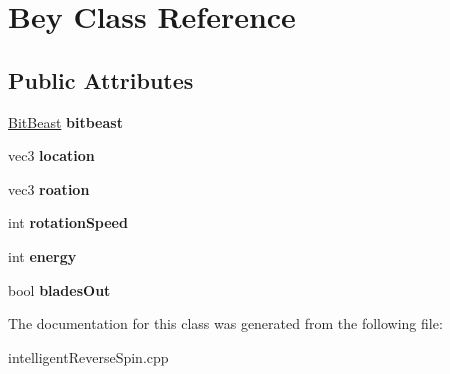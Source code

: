 \hypertarget{classBey}{\section{Bey Class Reference}
\label{classBey}
}
\subsection*{Public Attributes}
\begin{DoxyCompactItemize}
\item 
\hypertarget{classBey_a79ce66c3536c9297c3d0353916f09d01}{\hyperlink{classBitBeast}{Bit\-Beast} {\bfseries bitbeast}}\label{classBey_a79ce66c3536c9297c3d0353916f09d01}

\item 
\hypertarget{classBey_a595ae41a184153811597ab8657819231}{vec3 {\bfseries location}}\label{classBey_a595ae41a184153811597ab8657819231}

\item 
\hypertarget{classBey_a271fa71bf8fbff906e219c437dc4a123}{vec3 {\bfseries roation}}\label{classBey_a271fa71bf8fbff906e219c437dc4a123}

\item 
\hypertarget{classBey_a5ab22f2d0a9c35d62db63a10dbffd51a}{int {\bfseries rotation\-Speed}}\label{classBey_a5ab22f2d0a9c35d62db63a10dbffd51a}

\item 
\hypertarget{classBey_a8002d5f9449b5fb381683817db4421b2}{int {\bfseries energy}}\label{classBey_a8002d5f9449b5fb381683817db4421b2}

\item 
\hypertarget{classBey_ad6ae485484b679c5f92faff9bcf4da9f}{bool {\bfseries blades\-Out}}\label{classBey_ad6ae485484b679c5f92faff9bcf4da9f}

\end{DoxyCompactItemize}


The documentation for this class was generated from the following file\-:\begin{DoxyCompactItemize}
\item 
intelligent\-Reverse\-Spin.\-cpp\end{DoxyCompactItemize}
